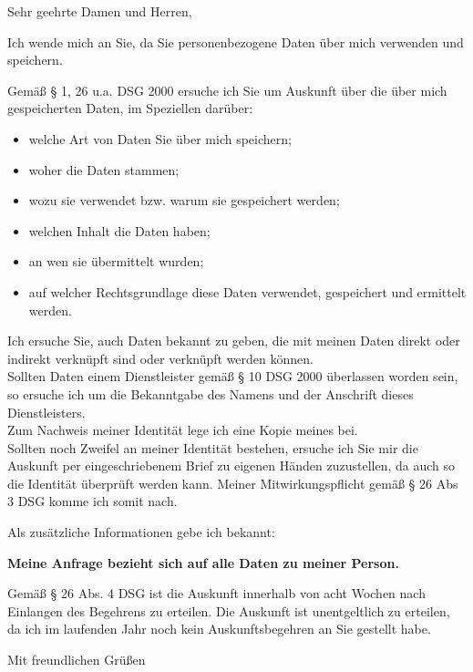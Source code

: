 \documentclass[%
  fontsize=12pt, %
  version=last%
]{scrlttr2}
\begin{document}
\begin{letter}
{
  \ziel{}
}

\opening{Sehr geehrte Damen und Herren,}
Ich wende mich an Sie, da Sie personenbezogene Daten über mich verwenden und speichern.\par
Gemäß § 1, 26 u.a. DSG 2000 ersuche ich Sie um Auskunft über die über mich gespeicherten Daten, im Speziellen darüber:
\begin{itemize}
  \item welche Art von Daten Sie über mich speichern;
  \item woher die Daten stammen;
  \item wozu sie verwendet bzw. warum sie gespeichert werden;
  \item welchen Inhalt die Daten haben;
  \item an wen sie übermittelt wurden;
  \item auf welcher Rechtsgrundlage diese Daten verwendet, gespeichert und ermittelt werden.
\end{itemize}

Ich ersuche Sie, auch Daten bekannt zu geben, die mit meinen Daten direkt oder indirekt verknüpft sind oder verknüpft werden können.\\
Sollten Daten einem Dienstleister gemäß § 10 DSG 2000 überlassen worden sein, so ersuche ich um die Bekanntgabe des Namens und der Anschrift dieses Dienstleisters.\\
Zum Nachweis meiner Identität lege ich eine Kopie meines \ausweis{} bei.\\
Sollten noch Zweifel an meiner Identität bestehen, ersuche ich Sie mir die Auskunft per eingeschriebenem Brief zu eigenen Händen zuzustellen, da auch so die Identität überprüft werden kann.
Meiner Mitwirkungspflicht gemäß § 26 Abs 3 DSG komme ich somit nach.\par

\ifx \zusatzinfo \undefined
\else
Als zusätzliche Informationen gebe ich bekannt:\\
\zusatzinfo{}
\fi

\textbf{Meine Anfrage bezieht sich auf alle Daten zu meiner Person.}\par

Gemäß § 26 Abs. 4 DSG ist die Auskunft innerhalb von acht Wochen nach Einlangen des Begehrens zu erteilen.
Die Auskunft ist unentgeltlich zu erteilen, da ich im laufenden Jahr noch kein Auskunftsbegehren an Sie gestellt habe.

\closing{Mit freundlichen Grüßen}


\end{letter}
\end{document}
